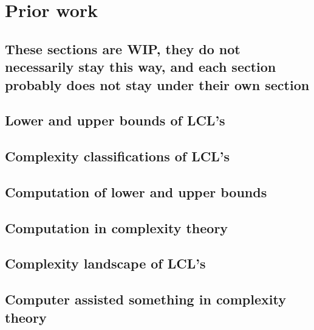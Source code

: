 
\section{Prior work} \label{sec:prior_work}


\subsection{These sections are WIP, they do not necessarily stay this way, and each section probably does not stay under their own section}
\subsection{Lower and upper bounds of LCL's}
\subsection{Complexity classifications of LCL's}
\subsection{Computation of lower and upper bounds}
\subsection{Computation in complexity theory}
\subsection{Complexity landscape of LCL's}
\subsection{Computer assisted something in complexity theory}
